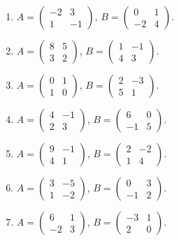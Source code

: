\begin{enumerate}[label=\arabic*.,  leftmargin=*]
\item $A=\begin{pmatrix}-2&3\\1&-1\end{pmatrix}$, $B=\begin{pmatrix}0&1\\-2&4\end{pmatrix}$.
\item $A=\begin{pmatrix}8&5\\3&2\end{pmatrix}$, $B=\begin{pmatrix}1&-1\\4&3\end{pmatrix}$.
\item $A=\begin{pmatrix}0&1\\1&0\end{pmatrix}$, $B=\begin{pmatrix}2&-3\\5&1\end{pmatrix}$.
\item $A=\begin{pmatrix}4&-1\\2&3\end{pmatrix}$, $B=\begin{pmatrix}6&0\\-1&5\end{pmatrix}$.
\item $A=\begin{pmatrix}9&-1\\4&1\end{pmatrix}$, $B=\begin{pmatrix}2&-2\\1&4\end{pmatrix}$.
\item $A=\begin{pmatrix}3&-5\\1&-2\end{pmatrix}$, $B=\begin{pmatrix}0&3\\-1&2\end{pmatrix}$.
\item $A=\begin{pmatrix}6&1\\-2&3\end{pmatrix}$, $B=\begin{pmatrix}-3&1\\2&0\end{pmatrix}$.

\end{enumerate}
